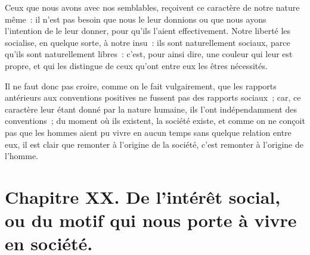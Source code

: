 \documentclass[french,twoside]{book} %
\newcommand\chapteropen{} %
\newcommand\chapterclose{} %
\begin{document}
Ceux que nous avons avec nos semblables, reçoivent ce caractère de notre nature même : il n’est pas besoin que nous le leur donnions ou que nous ayons l’intention de le leur donner, pour qu’ils l’aient effectivement. Notre liberté les socialise, en quelque sorte, à notre insu : ils sont naturellement sociaux, parce qu’ils sont naturellement libres : c’est, pour ainsi dire, une couleur qui leur est propre, et qui les distingue de ceux qu’ont entre eux les êtres nécessités.\par
Il ne faut donc pas croire, comme on le fait vulgairement, que les rapports antérieurs aux conventions positives ne fussent pas des rapports sociaux ; car, ce caractère leur étant donné par la nature humaine, ils l’ont indépendamment des conventions ; du moment où ils existent, la société existe, et comme on ne conçoit pas que les hommes aient pu vivre en aucun temps sans quelque relation entre eux, il est clair que remonter à l’origine de la société, c’est remonter à l’origine de l’homme.
\chapterclose


\chapteropen
\chapter[{Chapitre XX. De l’intérêt social, ou du motif qui nous porte à vivre en société.}]{Chapitre XX. De l’intérêt social, ou du motif qui nous porte à vivre en société.}\renewcommand{\leftmark}{Chapitre XX. De l’intérêt social, ou du motif qui nous porte à vivre en société.}
\end{document}
